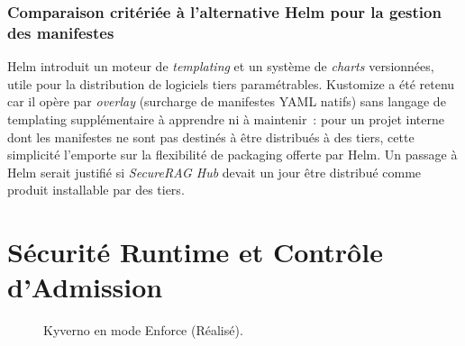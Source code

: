 \subsubsection{Comparaison critériée à l'alternative Helm pour la gestion des manifestes}
Helm introduit un moteur de \textit{templating} et un système de \textit{charts} versionnées, utile pour la distribution de logiciels tiers paramétrables. Kustomize a été retenu car il opère par \textit{overlay} (surcharge de manifestes YAML natifs) sans langage de templating supplémentaire à apprendre ni à maintenir~: pour un projet interne dont les manifestes ne sont pas destinés à être distribués à des tiers, cette simplicité l'emporte sur la flexibilité de packaging offerte par Helm. Un passage à Helm serait justifié si \textit{SecureRAG Hub} devait un jour être distribué comme produit installable par des tiers.

\section{Sécurité Runtime et Contrôle d'Admission}
\label{sec:runtime_security}

\begin{figure}[htbp]
\centering
\scriptsize
{}
\caption{Kyverno en mode Enforce (Réalisé).}
\label{fig:kyverno_audit_enforce}
\end{figure}

